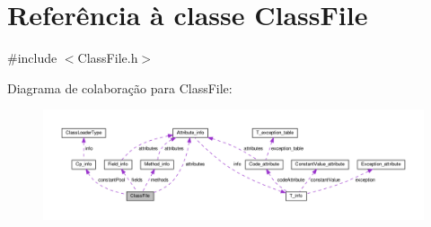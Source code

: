 \hypertarget{classClassFile}{}\section{Referência à classe Class\+File}
\label{classClassFile}


{\ttfamily \#include $<$Class\+File.\+h$>$}



Diagrama de colaboração para Class\+File\+:\nopagebreak
\begin{figure}[H]
\begin{center}
\leavevmode
\includegraphics[width=350pt]{classClassFile__coll__graph}
\end{center}
\end{figure}
